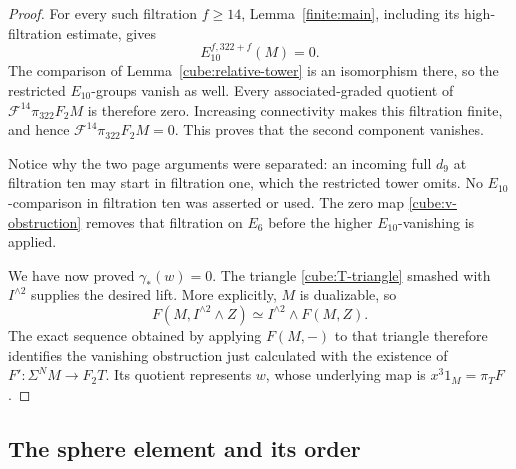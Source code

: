 \begin{proof}
For every such filtration \(f\geq14\),
Lemma~\ref{finite:main}, including its high-filtration
estimate, gives
\[
 E_{10}^{f,322+f}(M)=0.
\]
The comparison of Lemma~\ref{cube:relative-tower}
is an isomorphism there, so the restricted
\(E_{10}\)-groups vanish as well.  Every
associated-graded quotient of
\(\mathcal F^{14}\pi_{322}F_2M\) is therefore zero.
Increasing connectivity makes this filtration
finite, and hence
\(\mathcal F^{14}\pi_{322}F_2M=0\).
This proves that the second component vanishes.

Notice why the two page arguments were separated:
an incoming full \(d_9\) at filtration ten may
start in filtration one, which the restricted
tower omits.  No \(E_{10}\)-comparison in
filtration ten was asserted or used.  The zero
map \eqref{cube:v-obstruction} removes that
filtration on \(E_6\) before the higher
\(E_{10}\)-vanishing is applied.

We have now proved \(\gamma_*(w)=0\).
The triangle \eqref{cube:T-triangle} smashed with
\(I^{\wedge2}\) supplies the desired lift.
More explicitly, \(M\) is dualizable, so
\[
 F(M,I^{\wedge2}\wedge Z)
   \simeq I^{\wedge2}\wedge F(M,Z).
 \]
The exact sequence obtained by applying \(F(M,-)\)
to that triangle therefore identifies the
vanishing obstruction just calculated with the
existence of \(F':\Sigma^NM\to F_2T\).
Its quotient represents \(w\), whose underlying
map is \(x^3 1_M=\pi_TF\).
\end{proof}

\subsection{The sphere element and its order}

